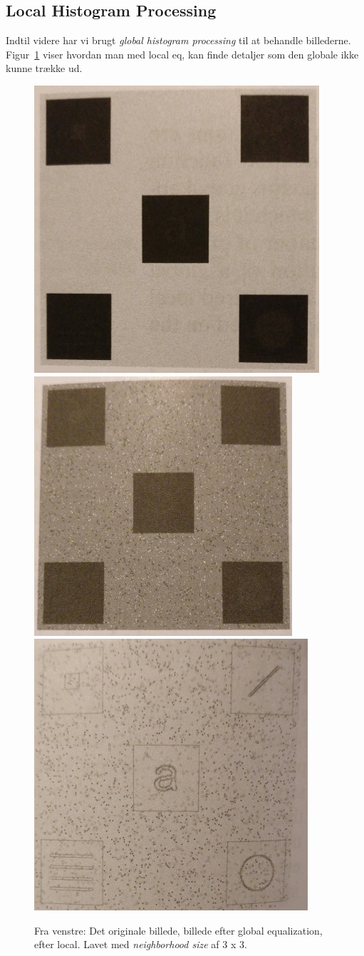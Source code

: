 \subsection{Local Histogram Processing}

Indtil videre har vi brugt \textit{global histogram processing} til at behandle billederne. Figur~\ref{fig:local-equalization} viser hvordan man med local eq, kan finde detaljer som den globale ikke kunne trække ud.

\begin{figure}[H]
	\centering
	\includegraphics[width=0.3\linewidth]{figs/spm01/original} \hfill
	\includegraphics[width=0.3\linewidth]{figs/spm01/global-eq}\hfill
	\includegraphics[width=0.3\linewidth]{figs/spm01/local-eq}
	
	\caption{Fra venstre: Det originale billede, billede efter global equalization, efter local. Lavet med \textit{neighborhood size} af 3 x 3.}
	\label{fig:local-equalization}
\end{figure}
